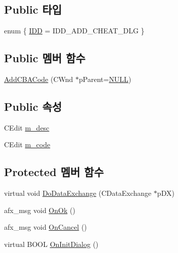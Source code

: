 \subsection*{Public 타입}
\begin{DoxyCompactItemize}
\item 
enum \{ \mbox{\hyperlink{class_add_c_b_a_code_ab086df2c41fbfe55405c6ac046dab7a5a74bfcc1c249905cacf32559b0a875855}{I\+DD}} = I\+D\+D\+\_\+\+A\+D\+D\+\_\+\+C\+H\+E\+A\+T\+\_\+\+D\+LG
 \}
\end{DoxyCompactItemize}
\subsection*{Public 멤버 함수}
\begin{DoxyCompactItemize}
\item 
\mbox{\hyperlink{class_add_c_b_a_code_a13fcdd2e1451c66ac0744a631d95fdb8}{Add\+C\+B\+A\+Code}} (C\+Wnd $\ast$p\+Parent=\mbox{\hyperlink{_system_8h_a070d2ce7b6bb7e5c05602aa8c308d0c4}{N\+U\+LL}})
\end{DoxyCompactItemize}
\subsection*{Public 속성}
\begin{DoxyCompactItemize}
\item 
C\+Edit \mbox{\hyperlink{class_add_c_b_a_code_ab5056f88f9c1f58a20a1ce718599305b}{m\+\_\+desc}}
\item 
C\+Edit \mbox{\hyperlink{class_add_c_b_a_code_ab4b404e9aed23e5dd265f543e98c9c6c}{m\+\_\+code}}
\end{DoxyCompactItemize}
\subsection*{Protected 멤버 함수}
\begin{DoxyCompactItemize}
\item 
virtual void \mbox{\hyperlink{class_add_c_b_a_code_a62f9304a8dd24bfd4621e59ba5073cc4}{Do\+Data\+Exchange}} (C\+Data\+Exchange $\ast$p\+DX)
\item 
afx\+\_\+msg void \mbox{\hyperlink{class_add_c_b_a_code_a63c5cc95366a1a0aad123432054f977a}{On\+Ok}} ()
\item 
afx\+\_\+msg void \mbox{\hyperlink{class_add_c_b_a_code_a94c94b1c124bb028f9237ee9bfa9f41d}{On\+Cancel}} ()
\item 
virtual B\+O\+OL \mbox{\hyperlink{class_add_c_b_a_code_a302c75c08dacdd95eecff6b3b74ebbe6}{On\+Init\+Dialog}} ()
\end{DoxyCompactItemize}


